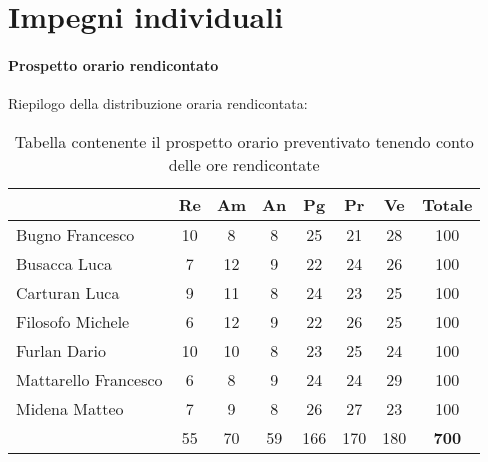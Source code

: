\section{Impegni individuali} \label{section:impegni_individuali}

\paragraph{Prospetto orario rendicontato}
Riepilogo della distribuzione oraria rendicontata:

\begin{table}[H]
  \centering
  \renewcommand{\arraystretch}{1.8}
  \begin{tabular}{l|cccccc|c}
    \rowcolor[HTML]{125E28} 
    \multicolumn{1}{c}{\color[HTML]{FFFFFF}\textbf{Nome}} 
    & \color[HTML]{FFFFFF}\textbf{Re} 
    & \color[HTML]{FFFFFF}\textbf{Am} 
    & \color[HTML]{FFFFFF}\textbf{An} 
    & \color[HTML]{FFFFFF}\textbf{Pg} 
    & \color[HTML]{FFFFFF}\textbf{Pr} 
    & \color[HTML]{FFFFFF}\textbf{Ve} 
    & \color[HTML]{FFFFFF}\textbf{Totale} \\
    \hline
    Bugno Francesco         & 10  & 8   & 8   & 25  & 21  & 28  & 100 \\
    Busacca Luca            & 7   & 12  & 9   & 22  & 24  & 26  & 100 \\
    Carturan Luca           & 9   & 11  & 8   & 24  & 23  & 25  & 100 \\
    Filosofo Michele        & 6   & 12  & 9   & 22  & 26  & 25  & 100 \\
    Furlan Dario 						& 10	& 10	& 8   & 23 	& 25	& 24 	& 100 \\
    Mattarello Francesco    & 6   & 8   & 9   & 24  & 24  & 29  & 100 \\
    Midena Matteo           & 7   & 9   & 8   & 26  & 27  & 23  & 100 \\
    \hline
    \rowcolor[HTML]{125E28}
    \multicolumn{1}{c}{\color[HTML]{FFFFFF}\textbf{Totale}} 
    & \color[HTML]{FFFFFF}55 
    & \color[HTML]{FFFFFF}70 
    & \color[HTML]{FFFFFF}59 
    & \color[HTML]{FFFFFF}166  
    & \color[HTML]{FFFFFF}170 
    & \color[HTML]{FFFFFF}180 
    & \color[HTML]{FFFFFF}\textbf{700}              
  \end{tabular}
  \caption{Tabella contenente il prospetto orario preventivato tenendo conto delle ore rendicontate}
\end{table}
